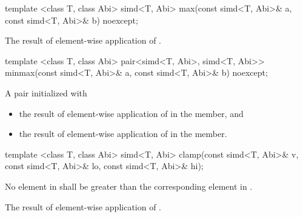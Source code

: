 \begin{itemdecl}
template <class T, class Abi> simd<T, Abi> max(const simd<T, Abi>& a, const simd<T, Abi>& b) noexcept;
\end{itemdecl}
\begin{itemdescr}
  \pnum\returns The result of element-wise application of  \foralli.
\end{itemdescr}

\begin{itemdecl}
template <class T, class Abi>
pair<simd<T, Abi>, simd<T, Abi>> minmax(const simd<T, Abi>& a, const simd<T, Abi>& b) noexcept;
\end{itemdecl}
\begin{itemdescr}
  \pnum\returns A pair initialized with
  \begin{itemize}
    \item the result of element-wise application of  \foralli in the  member, and
    \item the result of element-wise application of  \foralli in the  member.
  \end{itemize}
\end{itemdescr}

\begin{itemdecl}
template <class T, class Abi>
simd<T, Abi> clamp(const simd<T, Abi>& v, const simd<T, Abi>& lo, const simd<T, Abi>& hi);
\end{itemdecl}
\begin{itemdescr}
  \pnum\requires No element in  shall be greater than the corresponding element in .

  \pnum\returns The result of element-wise application of  \foralli.
\end{itemdescr}

%

